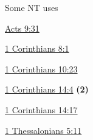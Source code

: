 				\begin{compactdesc}
					\item[Some NT uses] \textbf{}
						\begin{compactdesc}
							\item[{\hyperref[ACTS-9-31]{Acts 9:31}}]
							\item[{\hyperref[1CORINTHIANS-8-1]{1 Corinthians 8:1}}]
							\item[{\hyperref[1CORINTHIANS-10-23]{1 Corinthians 10:23}}]
							\item[{\hyperref[1CORINTHIANS-14-4]{1 Corinthians 14:4}}] \textbf{(2)}
							\item[{\hyperref[1CORINTHIANS-14-17]{1 Corinthians 14:17}}]
							\item[{\hyperref[1THESSALONIANS-5-11]{1 Thessalonians 5:11}}]
						\end{compactdesc}
				\end{compactdesc}
				
				
			\subparagraph{\texorpdfstring{}{}}
				\label{OIKODOME}
			
